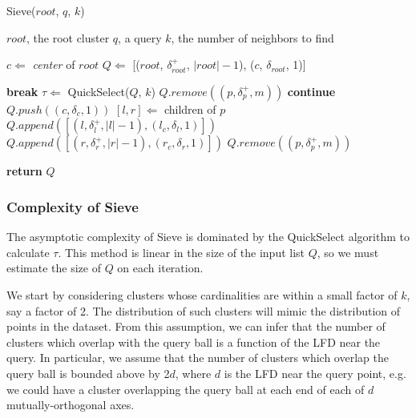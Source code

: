 \begin{algorithm} %
    \caption{Sieve($root$, $q$, $k$)} %
    \label{alg:methods:sieve} %
    \begin{algorithmic} %
        \REQUIRE $root$, the root cluster
        \REQUIRE $q$, a query
        \REQUIRE $k$, the number of neighbors to find

        \STATE $c \Leftarrow$ \emph{center} of $root$
        \STATE $Q \Leftarrow$ [($root$, $\delta^{+}_{root}$, $|root| - 1$), ($c$, $\delta_{root}$, 1)]

        \ALOOP{}
                \STATE \textbf{break}
            \ENDIF
            \STATE $\tau \Leftarrow$ QuickSelect($Q$, $k$)
                    \STATE $Q.remove((p, \delta^{+}_{p}, m))$
                \ENDIF
            \ENDFOR
                    \STATE \textbf{continue}
                        \STATE $Q.push((c, \delta_{c}, 1))$
                    \ENDFOR
                \ELSE
                    \STATE $[l, r] \Leftarrow$ children of $p$
                    \STATE $Q.append([(l, \delta^{+}_{l}, |l| - 1), (l_c, \delta_{l}, 1)])$
                    \STATE $Q.append([(r, \delta^{+}_{r}, |r| - 1), (r_c, \delta_{r}, 1)])$
                \ENDIF
                \STATE $Q.remove((p, \delta^{+}_{p}, m))$
            \ENDFOR
        \ENDALOOP

        \STATE \textbf{return} $Q$
    \end{algorithmic}
\end{algorithm}


\subsubsection{Complexity of Sieve}
\label{subsubsec:methods:sieve-complexity}

The asymptotic complexity of Sieve is dominated by the QuickSelect algorithm to calculate $\tau$.
This method is linear in the size of the input list $Q$, so we must estimate the size of $Q$ on each iteration. 

We start by considering clusters whose cardinalities are within a small factor of $k$, say a factor of 2.
The distribution of such clusters will mimic the distribution of points in the dataset. 
From this assumption, we can infer that the number of clusters which overlap with the query ball is a function of the LFD near the query.
In particular, we assume that the number of clusters which overlap the query ball is bounded above by 2$d$, where $d$ is the LFD near the query point, e.g. we could have a cluster overlapping the query ball at each end of each of $d$ mutually-orthogonal axes.

